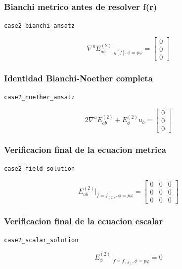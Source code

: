 \documentclass[11pt,a4paper]{article}
\begin{document}
\subsubsection{Bianchi metrico antes de resolver f(r)}

\noindent\texttt{case2\_bianchi\_ansatz}\par\nopagebreak[4]

\[
\nabla^aE^{(2)}_{ab}\big|_{g[f],\phi=p\varphi} = \left[\begin{matrix}0\\0\\0\end{matrix}\right]
\]

\subsubsection{Identidad Bianchi-Noether completa}

\noindent\texttt{case2\_noether\_ansatz}\par\nopagebreak[4]

\[
2\nabla^aE^{(2)}_{ab}+E^{(2)}_\phi u_b = \left[\begin{matrix}0\\0\\0\end{matrix}\right]
\]

\subsubsection{Verificacion final de la ecuacion metrica}

\noindent\texttt{case2\_field\_solution}\par\nopagebreak[4]

\[
E^{(2)}_{ab}\big|_{f=f_{(2)},\phi=p\varphi} = \left[\begin{matrix}0 & 0 & 0\\0 & 0 & 0\\0 & 0 & 0\end{matrix}\right]
\]

\subsubsection{Verificacion final de la ecuacion escalar}

\noindent\texttt{case2\_scalar\_solution}\par\nopagebreak[4]

\[
E^{(2)}_\phi\big|_{f=f_{(2)},\phi=p\varphi} = 0
\]
\end{document}
